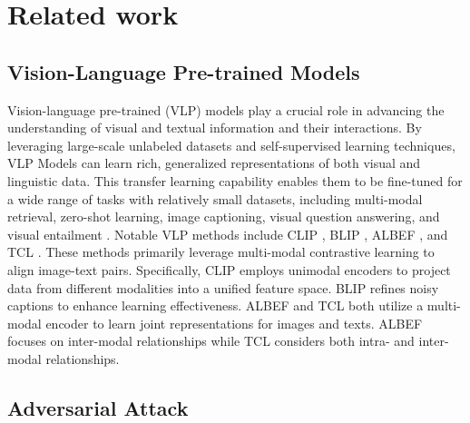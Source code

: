 \section{Related work}
\label{Rel}

\subsection{Vision-Language Pre-trained Models}

Vision-language pre-trained (VLP) models play a crucial role in advancing the understanding of visual and textual information and their interactions. By leveraging large-scale unlabeled datasets and self-supervised learning techniques, VLP Models can learn rich, generalized representations of both visual and linguistic data. This transfer learning capability enables them to be fine-tuned for a wide range of tasks with relatively small datasets, including multi-modal retrieval, zero-shot learning, image captioning, visual question answering, and visual entailment \cite{radford2021learning,li2022blip,li2021align,yang2022vision}. Notable VLP methods include CLIP \cite{radford2021learning}, BLIP \cite{li2022blip}, ALBEF \cite{li2021align}, and TCL \cite{yang2022vision}. These methods primarily leverage multi-modal contrastive learning to align image-text pairs. Specifically, CLIP employs unimodal encoders to project data from different modalities into a unified feature space. BLIP \cite{li2022blip} refines noisy captions to enhance learning effectiveness. ALBEF \cite{li2021align} and  TCL \cite{yang2022vision} both utilize a multi-modal encoder to learn joint representations for images and texts.  ALBEF \cite{li2021align} focuses on inter-modal relationships while  TCL \cite{yang2022vision} considers both intra- and inter-modal relationships.

\subsection{Adversarial Attack}

